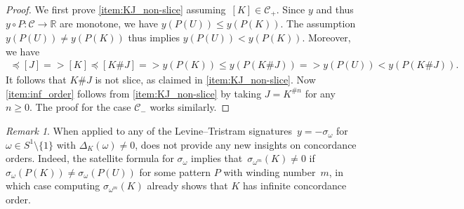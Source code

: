 \documentclass{amsart}
\newcommand{\CC}{\mathcal{C}}
\theoremstyle{remark}
\newtheorem{remark}[theorem]{Remark}
\def\Rightarrow{=>}
\begin{document}
\begin{proof}
We first prove \ref{item:KJ_non-slice} assuming~$[K]\in \CC_+$. Since $y$ and thus $y \circ P\colon\CC\to\mathbb{R}$ are monotone, we have $y(P(U)) \leq y(P(K))$. The assumption $y(P(U)) \neq y(P(K))$ thus implies $y(P(U)) < y(P(K))$. 
Moreover, we have
\begin{align*}
    [U] \preceq [J]
    \Rightarrow 
    [K] \preceq [K \# J]
    \Rightarrow
    y(P(K)) \leq y(P(K\# J))
    \Rightarrow
    y(P(U)) < y(P(K\# J)).
\end{align*}
It follows that $K\# J$ is not slice, as claimed in \ref{item:KJ_non-slice}. Now \ref{item:inf_order} follows from \ref{item:KJ_non-slice} by taking $J = K^{\#n}$ for any~$n \geq 0$.
The proof for the case $\CC_-$ works similarly. 
\end{proof}

\begin{remark}
    When applied to any of the Levine--Tristram signatures~$y=-\sigma_\omega$ for $\omega \in S^1 \setminus \{1\}$ with $\Delta_K(\omega) \neq 0$,  does not provide any new insights on concordance orders. Indeed, the satellite formula for $\sigma_\omega$ \cite[Theorem~2]{litherland} implies that~$\sigma_{\omega^m}(K) \neq 0$ if $\sigma_\omega(P(K)) \neq \sigma_\omega(P(U))$ for some pattern $P$ with winding number~$m$, in which case computing $\sigma_{\omega^m}(K)$ already shows that $K$ has infinite concordance order. 
\end{remark}
\end{document}
